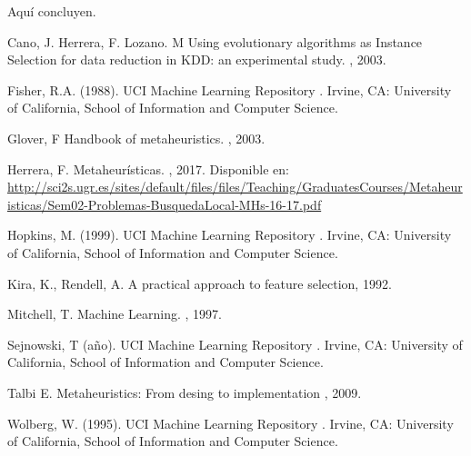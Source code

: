 \documentclass{ci5652}
\begin{document}
Aquí concluyen.


\small


\begin{thebibliography}{99}

Cano, J. Herrera, F. Lozano. M
\newblock Using evolutionary algorithms as Instance Selection for data
reduction in KDD: an experimental study.
, 2003.

Fisher, R.A. (1988). UCI Machine Learning Repository
.
\newblock Irvine, CA: University of California, School of Information and Computer Science.

Glover, F
\newblock Handbook of metaheuristics.
, 2003.

Herrera, F.
\newblock Metaheurísticas.
, 2017. Disponible en:
\url{http://sci2s.ugr.es/sites/default/files/files/Teaching/GraduatesCourses/Metaheuristicas/Sem02-Problemas-BusquedaLocal-MHs-16-17.pdf}

Hopkins, M. (1999). UCI Machine Learning Repository
.
\newblock Irvine, CA: University of California, School of Information and Computer Science.

Kira, K., Rendell, A.
\newblock A practical approach to feature selection, 1992.

Mitchell, T.
\newblock Machine Learning.
, 1997.

Sejnowski, T (año). UCI Machine Learning Repository
.
\newblock Irvine, CA: University of California, School of Information and Computer Science.

Talbi E.
\newblock Metaheuristics: From desing to implementation
, 2009.

Wolberg, W. (1995). UCI Machine Learning Repository
.
\newblock Irvine, CA: University of California, School of Information and Computer Science.

%
\end{thebibliography}
\end{document}
